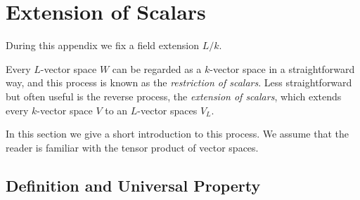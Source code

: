 \section{Extension of Scalars}

\label{appendix: extension of scalars}


\begin{fluff}
  During this appendix we fix a field extension $L/k$.
  
  Every $L$-vector space $W$ can be regarded as a $k$-vector space in a straightforward way, and this process is known as the \emph{restriction of scalars}.
  Less straightforward but often useful is the reverse process, the \emph{extension of scalars}, which extends every $k$-vector space $V$ to an $L$-vector spaces $V_L$.
  
  In this section we give a short introduction to this process.
  We assume that the reader is familiar with the tensor product of vector spaces.
\end{fluff}



\subsection{Definition and Universal Property}


